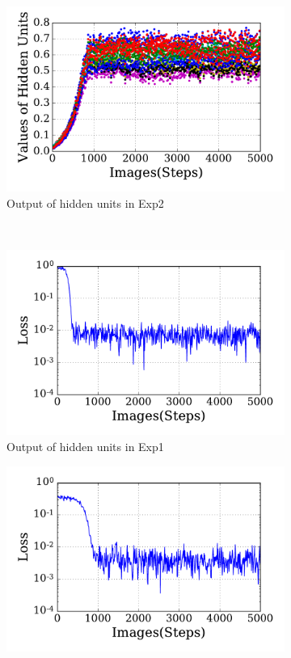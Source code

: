 \begin{figure}
\begin{subfigure}[t]{0.45\textwidth}
		\includegraphics[width=\textwidth]{pics_sdlm/31_exp_RBM_noise/exp2_hid_s.pdf}
		\caption{Output of hidden units in Exp2}
	\end{subfigure}\\
	\begin{subfigure}[t]{0.45\textwidth}
		\includegraphics[width=\textwidth]{pics_sdlm/31_exp_RBM_noise/exp1_loss_s.pdf}
		\caption{Output of hidden units in Exp1}
	\end{subfigure}
	\begin{subfigure}[t]{0.45\textwidth}
		\includegraphics[width=\textwidth]{pics_sdlm/31_exp_RBM_noise/exp2_loss_s.pdf}

\end{subfigure}
\end{figure}
